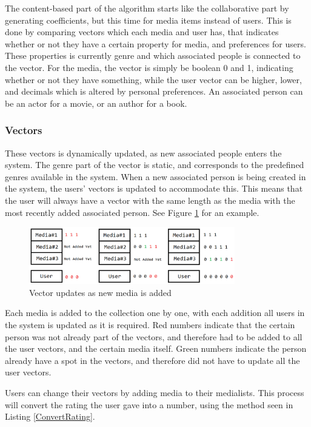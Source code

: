 The content-based part of the algorithm starts like the collaborative part by generating coefficients, but this time for media items instead of users. This is done by comparing vectors which each media and user has, that indicates whether or not they have a certain property for media, and preferences for users. These properties is currently genre and which associated people is connected to the vector. For the media, the vector is simply be boolean 0 and 1, indicating whether or not they have something, while the user vector can be higher, lower, and decimals which is altered by personal preferences. An associated person can be an actor for a movie, or an author for a book.

\subsubsection{Vectors}

These vectors is dynamically updated, as new associated people enters the system. The genre part of the vector is static, and corresponds to the predefined genres available in the system. When a new associated person is being created in the system, the users' vectors is updated to accommodate this. This means that the user will always have a vector with the same length as the media with the most recently added associated person. See Figure \ref{VectorUpdate} for an example.

\begin{figure}[htb]
\centering
\includegraphics[width=0.8\textwidth]{Images/VectorUpdate.png}
\caption{Vector updates as new media is added}
\label{VectorUpdate}
\end{figure}

Each media is added to the collection one by one, with each addition all users in the system is updated as it is required. Red numbers indicate that the certain person was not already part of the vectors, and therefore had to be added to all the user vectors, and the certain media itself. Green numbers indicate the person already have a spot in the vectors, and therefore did not have to update all the user vectors.

Users can change their vectors by adding media to their medialists. This process will convert the rating the user gave into a number, using the method seen in Listing \ref{ConvertRating}.

